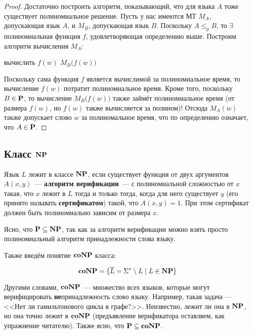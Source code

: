 \begin{proof}
 Достаточно построить алгоритм, показывающий, что для языка $A$ тоже существует 
 полиномиальное решение. Пусть у нас имеются МТ $M_A$, допускающая язык $A$, и 
 $M_B$, допускающая язык $B$. Поскольку $A \leqslant_p B$, то $\exists$ 
 полиномиальная функция $f$, удовлетворяющая определению выше. Построим алгоритм вычисления $M_A$:
 \begin{algorithmic}
    \State вычислить $f(w)$
    \State \Return $M_B\big(f(w)\big)$
 \end{algorithmic}
 Поскольку сама функция $f$ является вычислимой за полиномиальное время, то 
 вычисление $f(w)$ потратит полиномиальное время. Кроме того, поскольку 
 $B \in \mathbf{P}$, то вычисление $M_B\big(f(w)\big)$ также займёт полиномиальное 
 время (от размера $f(w)$, но $f(w)$ также вычисляется за полином)! Отсюда 
 $M_A(w)$ также допускает слово $w$ за полиномальное время, что по определению 
 означает, что $A \in \mathbf{P}$.
\end{proof}

\subsection{Класс $\mathbf{NP}$}

\begin{Def}
  Язык \(L\) лежит в классе \(\mathbf{NP}\), если существует функция 
  от двух аргументов \(A(x, y)\)~--- \textbf{алгоритм верификации}~---  с 
  полиномиальной сложностью от \(x\) такая, что \(x\) лежит в \(L\) 
  тогда и только тогда, когда для него существует \(y\) (его принято называть 
  \textbf{сертификатом}) такой, что \(A(x, y) = 1\). При этом сертификат должен
  быть полиномиально зависим от размера \(x\).
\end{Def}

Ясно, что $\mathbf{P} \subseteq \mathbf{NP}$, так как за алгоритм верификации можно
взять просто полиномиальный алгоритм принадлежности слова языку.

Также введём понятие $\mathbf{coNP}$ класса:

\begin{Def}
  \[
    \mathbf{coNP} = \{\overline{L} = \Sigma^{*} \setminus L \mid L \in \mathbf{NP}\}
  \]
\end{Def}

Другими словами, $\mathbf{coNP}$~--- множество всех языков, которые могут
верифицировать \textbf{не}принадлежность слово языку. Например, такая задача
--- <<Нет ли гамильтонового цикла в графе?>>. Неизвестно, лежит ли она в $\mathbf{NP}$,
но она точно лежит в $\mathbf{coNP}$ (предъявление верификатора оставляем, как
упражнение читателю). Также ясно, что $\mathbf{P} \subseteq \mathbf{coNP}$.

